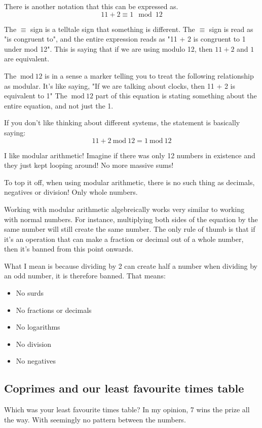 \documentclass{article}
\newcommand{\inmod}{\ \text{mod}\ }
\begin{document}
  There is another notation that this can be expressed as.
  \[ 11 + 2 \equiv 1 \mod 12 \]

  The $\equiv$ sign is a telltale sign that something is different. The $\equiv$ sign is read as "is congruent to", and the entire expression reads as "11 + 2 is congruent to 1 under mod 12". This is saying that if we are using modulo 12, then $11 + 2$ and $1$ are equivalent.

  The $\inmod 12$ is in a sense a marker telling you to treat the following
  relationship as modular. It's like saying, "If we are talking about clocks, 
  then 11 + 2 is equivalent to 1" The $\inmod 12$ part of this equation is 
  stating something about the entire equation, and not just the 1.

  If you don't like thinking about different systems, the statement is basically saying:
  \[ 11 + 2 \inmod 12 = 1 \inmod 12 \]

  I like modular arithmetic! Imagine if there was only 12 numbers in existence and they just kept looping around! No more massive sums!

  To top it off, when using modular arithmetic, there is no such thing as decimals, negatives or division! Only whole numbers.

  Working with modular arithmetic algebreically works very similar to working with
  normal numbers. For instance, multiplying both sides of the equation by the same
  number will still create the same number. The only rule of thumb is that if
  it's an operation that can make a fraction or decimal out of a whole number,
  then it's banned from this point onwards. 
  
  What I mean is because dividing by 2 can create half a number when dividing
  by an odd number, it is therefore banned. That means:

  \begin{itemize}
    \item No surds
    \item No fractions or decimals
    \item No logarithms
    \item No division
    \item No negatives
  \end{itemize}
  \subsection*{Coprimes and our least favourite times table}
  
  Which was your least favourite times table? In my opinion, 7 wins the prize all the way. With seemingly no pattern between the numbers.
\end{document}
